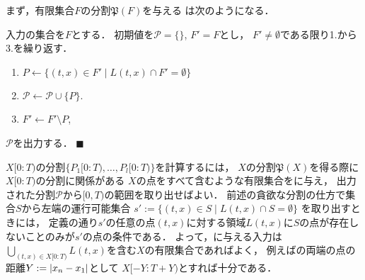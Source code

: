 まず，有限集合$F$の分割$\mathfrak{P}(F)$を与える
{\setPartitionAlgorithm}は次のようになる．

\begin{setPartitionAlgorithmForTimeSpecifiedProblemOnLine}
  入力の集合を$F$とする．
  初期値を$\mathcal{P} = \{\}$, $F' = F$とし，
  $F' \neq \emptyset$である限り1.から3.を繰り返す．
  \begin{enumerate}
    \item $P \gets
      \{ (t, x) \in F' \mid L(t, x) \cap F' = \emptyset \}$
    \item $\mathcal{P} \gets \mathcal{P} \cup \{ P \}$.
    \item $F' \gets F' \setminus P$, 
  \end{enumerate}
  $\mathcal{P}$を出力する．
  $\blacksquare$
\end{setPartitionAlgorithmForTimeSpecifiedProblemOnLine}

$X[0:T)$の分割$\{ P_1[0:T), \ldots, P_l[0:T) \}$を計算するには，
$X$の分割$\mathfrak{P}(X)$を得る際に$X[0:T)$の分割に関係がある
$X$の点をすべて含むような有限集合を{\setPartitionAlgorithm}に与え，
出力された分割$\mathcal{P}$から$[0, T)$の範囲を取り出せばよい．
%
前述の貪欲な分割の仕方で集合$S$から左端の運行可能集合
$s' := \{ (t, x) \in S \mid L(t, x) \cap S = \emptyset \}$
を取り出すときには，
定義の通り$s'$の任意の点$(t, x)$に対する領域$L(t, x)$に$S$の点が存在しないことのみが$s'$の点の条件である．
よって，{\setPartitionAlgorithm}に与える入力は
$\bigcup_{(t, x) \in X[0:T)} L(t, x)$を含む$X$の有限集合であればよく，
例えば{\graphLine}の両端の点の距離$Y := \lvert{x_n - x_1}\rvert$として
$X[-Y: T + Y)$とすれば十分である．
